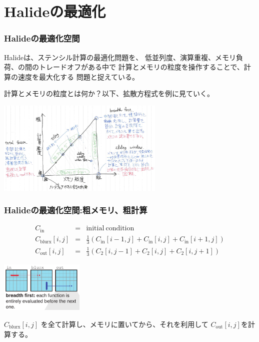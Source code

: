 \documentclass[dvipdfmx,cjk]{beamer}
\begin{document}
\section{Halideの最適化} 
\begin{frame}\frametitle{Halideの最適化空間}

Halideは、ステンシル計算の最適化問題を、
低並列度、演算重複、メモリ負荷、の間のトレードオフがある中で
計算とメモリの粒度を操作することで、計算の速度を最大化する
問題と捉えている。

計算とメモリの粒度とは何か？以下、拡散方程式を例に見ていく。

\begin{center}
\includegraphics[width=8cm]{figure/doc/schedule-space.png}
\end{center}
\end{frame}


\begin{frame}\frametitle{Halideの最適化空間:粗メモリ、粗計算}

\begingroup \footnotesize
\begin{eqnarray*}
C_\mathrm{in} &=& \mathrm{initial~condition} \\
C_\mathrm{blurx} [i,j] &=& \frac{1}{3}\left(C_\mathrm{in}[i-1,j] + C_\mathrm{in}[i,j] + C_\mathrm{in}[i+1,j]\right) \\
C_\mathrm{out} [i,j] &=& \frac{1}{3}\left(C_\mathrm{2}[i,j-1] + C_\mathrm{2}[i,j] + C_\mathrm{2}[i,j+1]\right)
\end{eqnarray*}
\endgroup


\begin{center}
\includegraphics[width=4cm]{figure/doc/blur-breadth-first.png}
\end{center}


$C_\mathrm{blurx} [i,j]$ を全て計算し、メモリに置いてから、それを利用して
$C_\mathrm{out} [i,j]$を計算する。



\end{frame}
\end{document}
